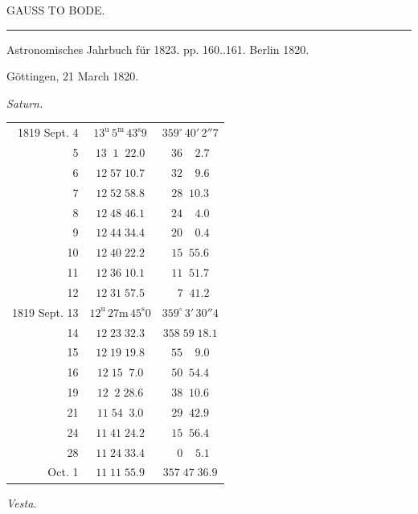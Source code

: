 \clearpage
{}
\hypertarget{native-433-part-lower}{}
\begin{center}
{\Large GAUSS TO BODE.}

\rule{0.6\linewidth}{0.4pt}

Astronomisches Jahrbuch für 1823. pp. 160..161. Berlin 1820.
\end{center}

\hfill Göttingen, 21 March 1820.

\begin{center}
\emph{Saturn.}
\end{center}

\begin{center}
\begin{tabular}{r|c|c}
1819 Sept. 4 & $13^{\mathrm u}\,5^{\mathrm m}\,43^{\mathrm s}9$ & $359^\circ\,40'\,2''7$ \\
5 & $13\;\;1\;\;22.0$ & $36\;\;\;\;2.7$ \\
6 & $12\;57\;10.7$ & $32\;\;\;\;9.6$ \\
7 & $12\;52\;58.8$ & $28\;\;10.3$ \\
8 & $12\;48\;46.1$ & $24\;\;\;\;4.0$ \\
9 & $12\;44\;34.4$ & $20\;\;\;\;0.4$ \\
10 & $12\;40\;22.2$ & $15\;\;55.6$ \\
11 & $12\;36\;10.1$ & $11\;\;51.7$ \\
12 & $12\;31\;57.5$ & $\;\;7\;\;41.2$ \\
\hline
1819 Sept. 13 & $12^{\mathrm u}\,27\mathrm{m}\,45^{\mathrm s}0$ & $359^\circ\,3'\,30''4$ \\
14 & $12\;23\;32.3$ & $358\;59\;18.1$ \\
15 & $12\;19\;19.8$ & $55\;\;\;\;9.0$ \\
16 & $12\;15\;\;7.0$ & $50\;\;54.4$ \\
19 & $12\;\;2\;28.6$ & $38\;\;10.6$ \\
21 & $11\;54\;\;3.0$ & $29\;\;42.9$ \\
24 & $11\;41\;24.2$ & $15\;\;56.4$ \\
28 & $11\;24\;33.4$ & $\;\;0\;\;\;\;5.1$ \\
Oct. 1 & $11\;11\;55.9$ & $357\;47\;36.9$ \\
\end{tabular}
\end{center}

\begin{center}
\textit{Vesta.}
\end{center}

